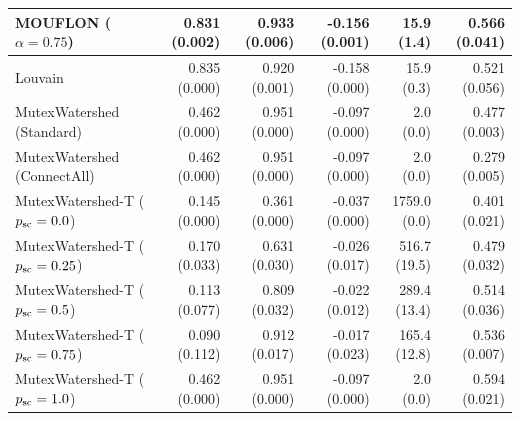 \begin{table}[tp]
{\begin{tabular}{lrrrrr}
MOUFLON ($\alpha=0.75$) & 0.831 (0.002) & 0.933 (0.006) & -0.156 (0.001) & 15.9 (1.4) & 0.566 (0.041) \\
\midrule
Louvain & 0.835 (0.000) & 0.920 (0.001) & -0.158 (0.000) & 15.9 (0.3) & 0.521 (0.056) \\
\midrule
MutexWatershed (Standard) & 0.462 (0.000) & 0.951 (0.000) & -0.097 (0.000) & 2.0 (0.0) & 0.477 (0.003) \\
MutexWatershed (ConnectAll) & 0.462 (0.000) & 0.951 (0.000) & -0.097 (0.000) & 2.0 (0.0) & 0.279 (0.005) \\
MutexWatershed-T ($p_{\rm sc}=0.0$) & 0.145 (0.000) & 0.361 (0.000) & -0.037 (0.000) & 1759.0 (0.0) & 0.401 (0.021) \\
MutexWatershed-T ($p_{\rm sc}=0.25$) & 0.170 (0.033) & 0.631 (0.030) & -0.026 (0.017) & 516.7 (19.5) & 0.479 (0.032) \\
MutexWatershed-T ($p_{\rm sc}=0.5$) & 0.113 (0.077) & 0.809 (0.032) & -0.022 (0.012) & 289.4 (13.4) & 0.514 (0.036) \\
MutexWatershed-T ($p_{\rm sc}=0.75$) & 0.090 (0.112) & 0.912 (0.017) & -0.017 (0.023) & 165.4 (12.8) & 0.536 (0.007) \\
MutexWatershed-T ($p_{\rm sc}=1.0$) & 0.462 (0.000) & 0.951 (0.000) & -0.097 (0.000) & 2.0 (0.0) & 0.594 (0.021) \\
\bottomrule
\end{tabular}}
\end{table}